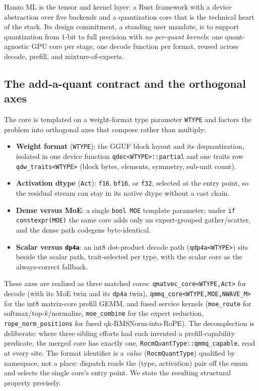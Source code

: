 \documentclass[11pt]{article}
\begin{document}
Hanzo ML is the tensor and kernel layer: a Rust framework with a device abstraction over five
backends and a quantization core that is the technical heart of the stack. Its design commitment,
a standing user mandate, is to support quantization from $1$-bit to full precision with \emph{no
per-quant kernels}: one quant-agnostic GPU core per stage, one decode function per format, reused
across decode, prefill, and mixture-of-experts.

\subsection{The add-a-quant contract and the orthogonal axes}
\label{sec:axes}

The core is templated on a weight-format type parameter \texttt{WTYPE} and factors the problem into
orthogonal axes that compose rather than multiply:
\begin{itemize}
  \item \textbf{Weight format} (\texttt{WTYPE}): the GGUF block layout and its dequantization, isolated
  in one device function \texttt{qdec<WTYPE>::partial} and one traits row \texttt{qdw\_traits<WTYPE>}
  (block bytes, elements, symmetry, sub-unit count).
  \item \textbf{Activation dtype} (\texttt{Act}): \texttt{f16}, \texttt{bf16}, or \texttt{f32}, selected at
  the entry point, so the residual stream can stay in its native dtype without a cast chain.
  \item \textbf{Dense versus MoE}: a single \texttt{bool MOE} template parameter; under
  \texttt{if constexpr(MOE)} the same core adds only an expert-grouped gather/scatter, and the dense
  path codegens byte-identical.
  \item \textbf{Scalar versus \texttt{dp4a}}: an int8 dot-product decode path
  (\texttt{qdp4a<WTYPE>}) sits beside the scalar path, trait-selected per type, with the scalar core
  as the always-correct fallback.
\end{itemize}
These axes are realized as three matched cores: \texttt{qmatvec\_core<WTYPE,Act>} for decode (with
its MoE twin and its \texttt{dp4a} twin), \texttt{qmmq\_core<WTYPE,MOE,NWAVE\_M>} for the int8
matrix-core prefill GEMM, and fused service kernels (\texttt{moe\_route} for softmax/top-$k$/normalize,
\texttt{moe\_combine} for the expert reduction, \texttt{rope\_norm\_positions} for fused
qk-RMSNorm-into-RoPE). The decomplection is deliberate: where three sibling efforts had each invented
a prefill-capability predicate, the merged core has exactly one, \texttt{RocmQuantType::qmmq\_capable},
read at every site. The format identifier is a \emph{value} (\texttt{RocmQuantType}) qualified by
namespace, not a place: dispatch reads the (type, activation) pair off the enum and selects the single
core's entry point. We state the resulting structural property precisely.
\end{document}
